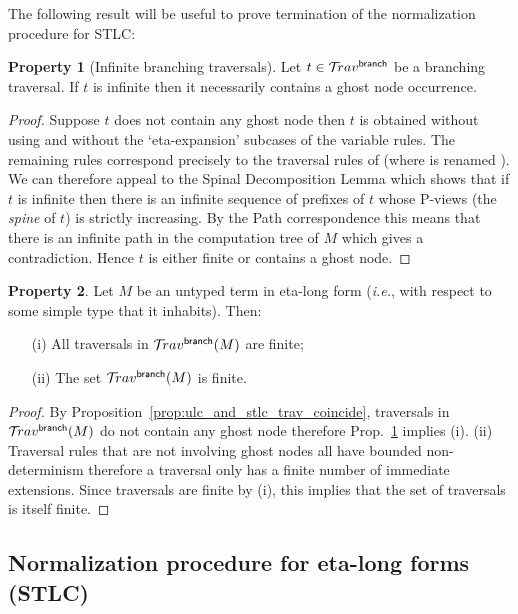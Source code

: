 \documentclass{article}
\makeatletter
\theoremstyle{plain}
\theoremstyle{definition}
\newtheorem{property}{Property}[section]
\theoremstyle{remark}
\newcommand{\ghostlmd}{{\lambda\!\!\lambda}}
\newcommand{\branching}{{\sf branch}}
\newcommand{\travsetbr}{{\travset^\branching}}
\renewcommand\ie{{\it i.e.\@\xspace}}
\makeatother
\begin{document}
The following result will be useful to prove termination of the normalization procedure for STLC:
\begin{property}[Infinite branching traversals]
\label{prop:branching_spine_property}
Let $t\in \travsetbr$ be a branching traversal. If $t$ is infinite then it necessarily contains a ghost node occurrence.
\end{property}
\begin{proof}
Suppose $t$ does not contain any ghost node then
$t$ is obtained without using \rulenamet{Lam^\ghostlmd_\branching} and without the `eta-expansion' subcases of the variable rules. The remaining rules correspond precisely to the traversal rules of
\cite{Ong2006} (where  is renamed ).
We can therefore appeal to the Spinal Decomposition Lemma
\cite[Lemma 14]{Ong2006} which shows that if $t$ is infinite then there is an infinite sequence of prefixes of $t$ whose P-views (the \emph{spine} of $t$) is strictly increasing. By the Path correspondence this means that there is an infinite path in the computation tree of $M$ which gives a contradiction. Hence $t$ is either finite or contains a ghost node.
\end{proof}

\begin{property}
\label{prop:etalong_trav_finite}
Let $M$ be an untyped term in eta-long form (\ie, with respect to some simple type that it inhabits).
Then:
\begin{enumerate}
\item[(i)] All traversals in $\travsetbr(M)$ are finite;
\item[(ii)] The set $\travsetbr(M)$ is finite.
\end{enumerate}
\end{property}
\begin{proof}
By Proposition~\ref{prop:ulc_and_stlc_trav_coincide}, traversals in $\travsetbr(M)$ do not contain any ghost node therefore Prop.~\ref{prop:branching_spine_property} implies (i).
(ii) Traversal rules that are not involving ghost nodes all have bounded non-determinism therefore a traversal only has a finite number of immediate extensions. Since traversals are finite by (i), this implies that the set of traversals is itself finite.
\end{proof}


\subsection{Normalization procedure for eta-long forms (STLC)}
\end{document}
